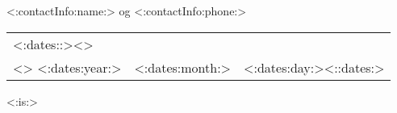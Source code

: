\documentclass[10pt,a4paper]{article}
\begin{document}
	<:contactInfo:name:> og <:contactInfo:phone:>

	\begin{tabular}{lll}<:dates::><>\\<>
		<:dates:year:> & <:dates:month:> & <:dates:day:><::dates:>
	\end{tabular}

	\vspace{1cm}

	
	
	
	
	<:is:>
\end{document}
